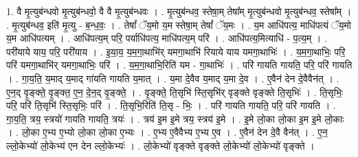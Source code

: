 \documentclass[17pt]{extarticle}
\begin{document}
1. वै मृ॒त्युब॑न्धवो मृ॒त्युब॑न्धवो॒ वै वै मृ॒त्युब॑न्धवः । . मृ॒त्युब॑न्धव॒ स्तेषा॒म् तेषा᳚म् मृ॒त्युब॑न्धवो मृ॒त्युब॑न्धव॒ स्तेषा᳚म् । . मृ॒त्युब॑न्धव॒ इति॑ मृ॒त्यु - ब॒न्ध॒वः॒ । . तेषां᳚ ॅय॒मो य॒म स्तेषा॒म् तेषां᳚ ॅय॒मः । . य॒म आधि॑पत्य॒ माधि॑पत्यं ॅय॒मो य॒म आधि॑पत्यम् । . आधि॑पत्य॒म् परि॒ पर्याधि॑पत्य॒ माधि॑पत्य॒म् परि॑ । . आधि॑पत्य॒मित्याधि॑ - प॒त्य॒म् । . परी॑याये याय॒ परि॒ परी॑याय । . इ॒या॒य॒ य॒म॒गा॒थाभि॑र् यमगा॒थाभि॑ रियाये याय यमगा॒थाभिः॑ । . य॒म॒गा॒थाभिः॒ परि॒ परि॑ यमगा॒थाभि॑र् यमगा॒थाभिः॒ परि॑ । . य॒म॒गा॒थाभि॒रिति॑ यम - गा॒थाभिः॑ । . परि॑ गायति गायति॒ परि॒ परि॑ गायति । . गा॒य॒ति॒ य॒माद् य॒माद् गा॑यति गायति य॒मात् । . य॒मा दे॒वैव य॒माद् य॒मा दे॒व । . ए॒वैन॑ देन दे॒वैवैन॑त् । . ए॒न॒द् वृ॒ङ्क्ते॒ वृ॒ङ्क्त॒ ए॒न॒ दे॒न॒द् वृ॒ङ्क्ते॒ । . वृ॒ङ्क्ते॒ ति॒सृभि॑ स्ति॒सृभि॑र् वृङ्क्ते वृङ्क्ते ति॒सृभिः॑ । . ति॒सृभिः॒ परि॒ परि॑ ति॒सृभि॑ स्ति॒सृभिः॒ परि॑ । . ति॒सृभि॒रिति॑ ति॒सृ - भिः॒ । . परि॑ गायति गायति॒ परि॒ परि॑ गायति । . गा॒य॒ति॒ त्रय॒ स्त्रयो॑ गायति गायति॒ त्रयः॑ । . त्रय॑ इ॒म इ॒मे त्रय॒ स्त्रय॑ इ॒मे । . इ॒मे लो॒का लो॒का इ॒म इ॒मे लो॒काः । . लो॒का ए॒भ्य ए॒भ्यो लो॒का लो॒का ए॒भ्यः । . ए॒भ्य ए॒वैवैभ्य ए॒भ्य ए॒व । . ए॒वैन॑ देन दे॒वै वैन॑त् । . ए॒न॒ ल्लो॒केभ्यो॑ लो॒केभ्य॑ एन देन ल्लो॒केभ्यः॑ । . लो॒केभ्यो॑ वृङ्क्ते वृङ्क्ते लो॒केभ्यो॑ लो॒केभ्यो॑ वृङ्क्ते । \newline
\end{document}
